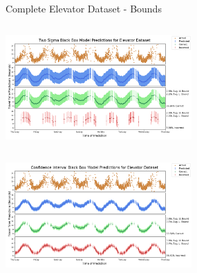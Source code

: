 \documentclass{beamer}
\begin{document}
\begin{frame}[t]{Complete Elevator Dataset - Bounds}

  \vspace*{-0.9cm}
  \begin{columns}[t]
    {\includegraphics[width = 2.8in]{images/elevator/two_sigma_black_box_model_predictions_for_elevator_dataset.png}}

    \begin{overlayarea}{0.5\textwidth}{0.5\textheight}


    \end{overlayarea}
  \end{columns}
  \vspace*{-0.3cm}

  \begin{columns}[t]
    {\includegraphics[width = 2.8in]{images/elevator/confidence_interval_black_box_model_predictions_for_elevator_dataset.png}}
  \end{columns}

\end{frame}
\end{document}
